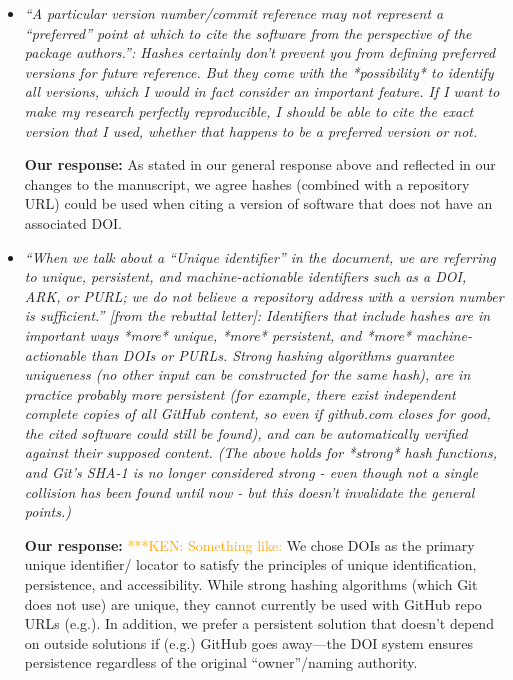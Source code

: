 \documentclass{article}
\newcommand{\niemnote}[1]{ {\textcolor{orange} { ***KEN: #1 }}} %
\begin{document}
\begin{enumerate}
\begin{itemize}
\item \emph{``A particular version number/commit reference may not represent a
``preferred'' point at which to cite the software from the perspective of the
package authors.'': Hashes certainly don't prevent you from defining preferred
versions for future reference. But they come with the *possibility* to identify
all versions, which I would in fact consider an important feature. If I want to
make my research perfectly reproducible, I should be able to cite the exact
version that I used, whether that happens to be a preferred version or not.}

\textbf{Our response:}
As stated in our general response above and reflected in our changes to the
manuscript, we agree hashes (combined with a
repository URL) could be used when citing a version of software that does not
have an associated DOI.

\item \emph{``When we talk about a ``Unique identifier'' in the document, we
are referring to unique, persistent, and machine-actionable identifiers such as
a DOI, ARK, or PURL; we do not believe a repository address with a version
number is sufficient.'' [from the rebuttal letter]: Identifiers that include
hashes are in important ways *more* unique, *more* persistent, and *more*
machine-actionable than DOIs or PURLs. Strong hashing algorithms guarantee
uniqueness (no other input can be constructed for the same hash), are in
practice probably more persistent (for example, there exist independent
complete copies of all GitHub content, so even if github.com closes for good,
the cited software could still be found), and can be automatically verified
against their supposed content. (The above holds for *strong* hash functions,
and Git's SHA-1 is no longer considered strong - even though not a single
collision has been found until now - but this doesn't invalidate the general
points.)}

\textbf{Our response:}
\niemnote{Something like:} We chose DOIs as the primary unique identifier\slash
locator to satisfy the principles of unique identification, persistence, and
accessibility. While strong hashing algorithms (which Git does not use) are
unique, they cannot currently be used with GitHub repo URLs (e.g.). In addition,
we prefer a persistent solution that doesn't depend on outside solutions if
(e.g.) GitHub goes away---the DOI system ensures persistence regardless of the
original ``owner''\slash naming authority.

\end{itemize}

\end{enumerate}

%
%
\end{document}
